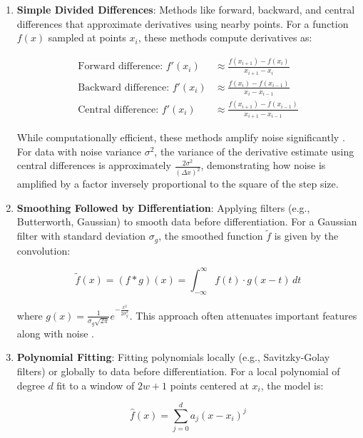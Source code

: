 \documentclass[10pt,journal,compsoc]{IEEEtran}
\begin{document}
\begin{enumerate}
    \item \textbf{Simple Divided Differences}: Methods like forward, backward, and central differences that approximate derivatives using nearby points. For a function $f(x)$ sampled at points $x_i$, these methods compute derivatives as:
    
    \begin{align}
        \text{Forward difference: } f'(x_i) &\approx \frac{f(x_{i+1}) - f(x_i)}{x_{i+1} - x_i} \\[5pt]
        \text{Backward difference: } f'(x_i) &\approx \frac{f(x_i) - f(x_{i-1})}{x_i - x_{i-1}} \\[5pt]
        \text{Central difference: } f'(x_i) &\approx \frac{f(x_{i+1}) - f(x_{i-1})}{x_{i+1} - x_{i-1}}
    \end{align}
    
    While computationally efficient, these methods amplify noise significantly \cite{kaw2021numerical}. For data with noise variance $\sigma^2$, the variance of the derivative estimate using central differences is approximately $\frac{2\sigma^2}{(\Delta x)^2}$, demonstrating how noise is amplified by a factor inversely proportional to the square of the step size.
    
    \item \textbf{Smoothing Followed by Differentiation}: Applying filters (e.g., Butterworth, Gaussian) to smooth data before differentiation. For a Gaussian filter with standard deviation $\sigma_g$, the smoothed function $\tilde{f}$ is given by the convolution:
    
    \begin{equation}
        \tilde{f}(x) = (f * g)(x) = \int_{-\infty}^{\infty} f(t) \cdot g(x-t) \, dt
    \end{equation}
    
    where $g(x) = \frac{1}{\sigma_g\sqrt{2\pi}}e^{-\frac{x^2}{2\sigma_g^2}}$. This approach often attenuates important features along with noise \cite{ahnert2007numerical}.
    
    \item \textbf{Polynomial Fitting}: Fitting polynomials locally (e.g., Savitzky-Golay filters) or globally to data before differentiation. For a local polynomial of degree $d$ fit to a window of $2w+1$ points centered at $x_i$, the model is:
    
    \begin{equation}
        \hat{f}(x) = \sum_{j=0}^{d} a_j (x - x_i)^j
    \end{equation}
    

\end{enumerate}
\end{document}
